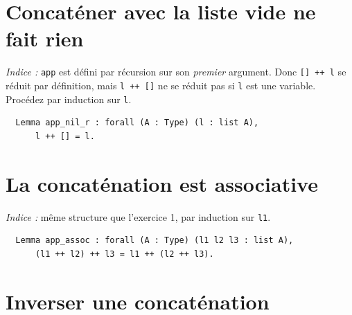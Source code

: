 \documentclass[11pt,a4paper]{article}
\newenvironment{exo}{
\begin{mdframed}[style=exostyle]}{
\end{mdframed}}
\newcommand{\cq}[1]{\texttt{#1}}
\begin{document}
\section{Concaténer avec la liste vide ne fait rien}



\textit{Indice :} \cq{app} est défini par récursion sur son \emph{premier}
argument. Donc \cq{[] ++ l} se réduit par définition, mais \cq{l ++ []} ne se
réduit pas si \cq{l} est une variable. Procédez par induction sur \cq{l}.

\begin{exo}
\begin{verbatim}
  Lemma app_nil_r : forall (A : Type) (l : list A),
      l ++ [] = l.
\end{verbatim}
\end{exo}

\section{La concaténation est associative}



\textit{Indice :} même structure que l'exercice 1, par induction sur \cq{l1}.

\begin{exo}
\begin{verbatim}
  Lemma app_assoc : forall (A : Type) (l1 l2 l3 : list A),
      (l1 ++ l2) ++ l3 = l1 ++ (l2 ++ l3).
\end{verbatim}
\end{exo}

\section{Inverser une concaténation}

\end{document}
